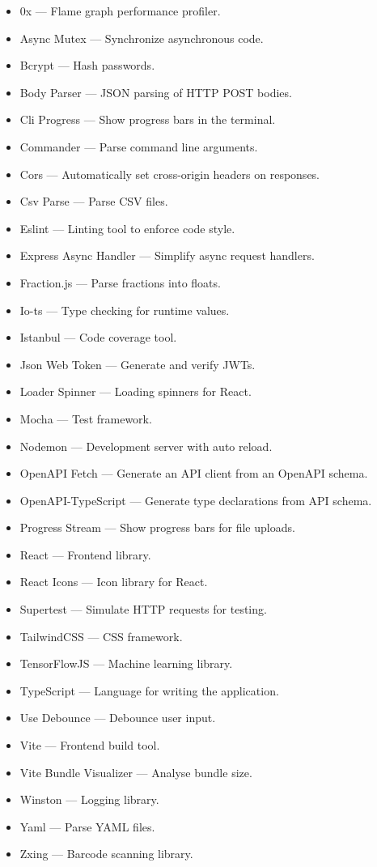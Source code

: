 \documentclass[11pt, twoside, a4paper]{report}
\begin{document}
\begin{itemize}
    \item 0x --- Flame graph performance profiler.
    \item Async Mutex --- Synchronize asynchronous code.
    \item Bcrypt --- Hash passwords.
    \item Body Parser --- JSON parsing of HTTP POST bodies.
    \item Cli Progress --- Show progress bars in the terminal.
    \item Commander --- Parse command line arguments.
    \item Cors --- Automatically set cross-origin headers on responses.
    \item Csv Parse --- Parse CSV files.
    \item Eslint --- Linting tool to enforce code style.
    \item Express Async Handler --- Simplify async request handlers.
    \item Fraction.js --- Parse fractions into floats.
    \item Io-ts --- Type checking for runtime values.
    \item Istanbul --- Code coverage tool.
    \item Json Web Token --- Generate and verify JWTs.
    \item Loader Spinner --- Loading spinners for React.
    \item Mocha --- Test framework.
    \item Nodemon --- Development server with auto reload.
    \item OpenAPI Fetch --- Generate an API client from an OpenAPI schema.
    \item OpenAPI-TypeScript --- Generate type declarations from API schema.
    \item Progress Stream --- Show progress bars for file uploads.
    \item React --- Frontend library.
    \item React Icons --- Icon library for React.
    \item Supertest --- Simulate HTTP requests for testing.
    \item TailwindCSS --- CSS framework.
    \item TensorFlowJS --- Machine learning library.
    \item TypeScript --- Language for writing the application.
    \item Use Debounce --- Debounce user input.
    \item Vite --- Frontend build tool.
    \item Vite Bundle Visualizer --- Analyse bundle size.
    \item Winston --- Logging library.
    \item Yaml --- Parse YAML files.
    \item Zxing --- Barcode scanning library.
\end{itemize}
\end{document}
